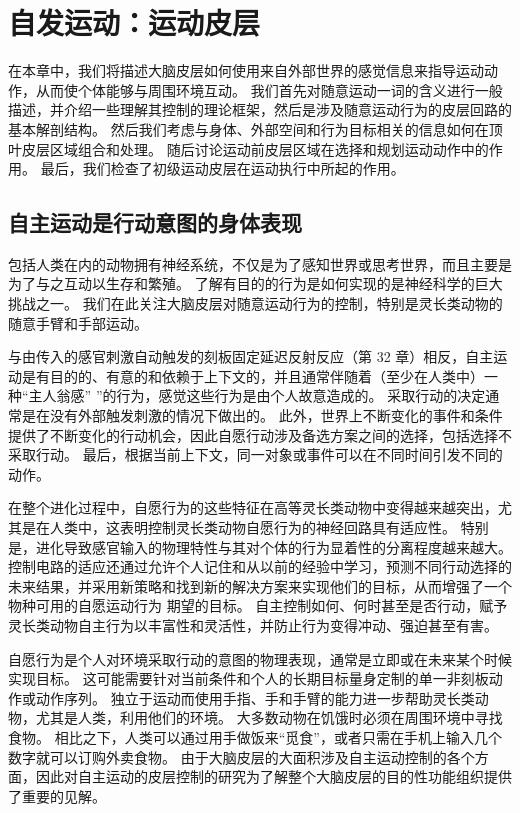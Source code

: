\chapter{自发运动：运动皮层} \label{chap:chap34}
在本章中，我们将描述大脑皮层如何使用来自外部世界的感觉信息来指导运动动作，从而使个体能够与周围环境互动。 我们首先对随意运动一词的含义进行一般描述，并介绍一些理解其控制的理论框架，然后是涉及随意运动行为的皮层回路的基本解剖结构。 然后我们考虑与身体、外部空间和行为目标相关的信息如何在顶叶皮层区域组合和处理。 随后讨论运动前皮层区域在选择和规划运动动作中的作用。 最后，我们检查了初级运动皮层在运动执行中所起的作用。

\section{自主运动是行动意图的身体表现}
包括人类在内的动物拥有神经系统，不仅是为了感知世界或思考世界，而且主要是为了与之互动以生存和繁殖。 了解有目的的行为是如何实现的是神经科学的巨大挑战之一。 我们在此关注大脑皮层对随意运动行为的控制，特别是灵长类动物的随意手臂和手部运动。

与由传入的感官刺激自动触发的刻板固定延迟反射反应（第 32 章）相反，自主运动是有目的的、有意的和依赖于上下文的，并且通常伴随着（至少在人类中）一种“主人翁感” ”的行为，感觉这些行为是由个人故意造成的。 采取行动的决定通常是在没有外部触发刺激的情况下做出的。 此外，世界上不断变化的事件和条件提供了不断变化的行动机会，因此自愿行动涉及备选方案之间的选择，包括选择不采取行动。 最后，根据当前上下文，同一对象或事件可以在不同时间引发不同的动作。

在整个进化过程中，自愿行为的这些特征在高等灵长类动物中变得越来越突出，尤其是在人类中，这表明控制灵长类动物自愿行为的神经回路具有适应性。 特别是，进化导致感官输入的物理特性与其对个体的行为显着性的分离程度越来越大。 控制电路的适应还通过允许个人记住和从以前的经验中学习，预测不同行动选择的未来结果，并采用新策略和找到新的解决方案来实现他们的目标，从而增强了一个物种可用的自愿运动行为 期望的目标。 自主控制如何、何时甚至是否行动，赋予灵长类动物自主行为以丰富性和灵活性，并防止行为变得冲动、强迫甚至有害。

自愿行为是个人对环境采取行动的意图的物理表现，通常是立即或在未来某个时候实现目标。 这可能需要针对当前条件和个人的长期目标量身定制的单一非刻板动作或动作序列。 独立于运动而使用手指、手和手臂的能力进一步帮助灵长类动物，尤其是人类，利用他们的环境。 大多数动物在饥饿时必须在周围环境中寻找食物。 相比之下，人类可以通过用手做饭来“觅食”，或者只需在手机上输入几个数字就可以订购外卖食物。 由于大脑皮层的大面积涉及自主运动控制的各个方面，因此对自主运动的皮层控制的研究为了解整个大脑皮层的目的性功能组织提供了重要的见解。


